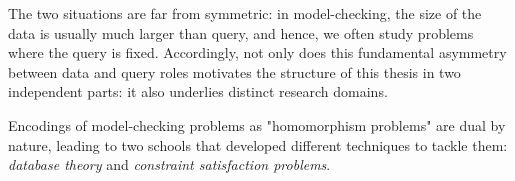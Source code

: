 The two situations are far from symmetric: in model-checking, the size of the
data is usually much larger than query,%
and hence, we often study problems where the query is fixed.
Accordingly, not only does this fundamental asymmetry between data and query roles motivates the structure of this thesis in two independent parts: it also underlies distinct research domains.

\begin{known}
	Encodings of model-checking problems as "homomorphism problems" are dual by nature,
	leading to two schools that developed different techniques to tackle them:
	\emph{database theory} and \emph{constraint satisfaction problems}.
\end{known}


